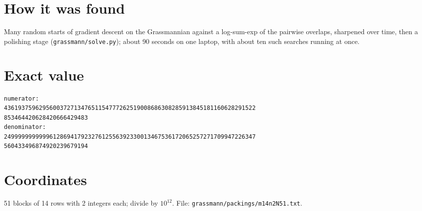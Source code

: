 \documentclass[11pt,a4paper]{article}
\begin{document}
\section{How it was found}
Many random starts of gradient descent on the Grassmannian against a log-sum-exp of the pairwise overlaps, sharpened over time, then a polishing stage (\texttt{grassmann/solve.py}); about 90 seconds on one laptop, with about ten such searches running at once.


\appendix
\section{Exact value}
{\small
\begin{verbatim}
numerator:
436193759629560037271347651154777262519008686308285913845181160628291522
853464420628420666429483
denominator:
249999999999961286941792327612556392330013467536172065257271709947226347
560433496874920239679194
\end{verbatim}}

\section{Coordinates}
51 blocks of 14 rows with 2 integers each; divide by $10^{12}$. File: \texttt{grassmann/packings/m14n2N51.txt}.
{\tiny
\begin{multicols}{4}
\end{multicols}}
\end{document}
